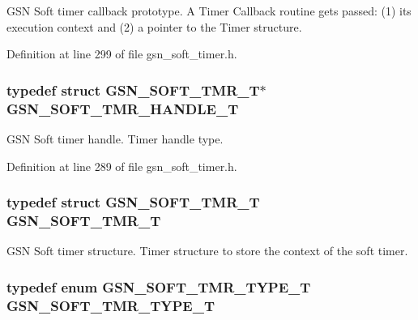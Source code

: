 GSN Soft timer callback prototype. A Timer Callback routine gets passed: (1) its execution context and (2) a pointer to the Timer structure. 



Definition at line 299 of file gsn\_\-soft\_\-timer.h.

\hypertarget{a00673_gaf35989ebc15417c38bca69fd5c17cceb}{
\subsubsection[{GSN\_\-SOFT\_\-TMR\_\-HANDLE\_\-T}]{\setlength{\rightskip}{0pt plus 5cm}typedef struct {\bf GSN\_\-SOFT\_\-TMR\_\-T}$\ast$ {\bf GSN\_\-SOFT\_\-TMR\_\-HANDLE\_\-T}}}
\label{a00673_gaf35989ebc15417c38bca69fd5c17cceb}


GSN Soft timer handle. Timer handle type. 



Definition at line 289 of file gsn\_\-soft\_\-timer.h.

\hypertarget{a00673_gac713d53bc7c13a7102bfce1b01b30c60}{
\subsubsection[{GSN\_\-SOFT\_\-TMR\_\-T}]{\setlength{\rightskip}{0pt plus 5cm}typedef struct {\bf GSN\_\-SOFT\_\-TMR\_\-T}  {\bf GSN\_\-SOFT\_\-TMR\_\-T}}}
\label{a00673_gac713d53bc7c13a7102bfce1b01b30c60}


GSN Soft timer structure. Timer structure to store the context of the soft timer. 

\hypertarget{a00673_ga9a084f729d0bbf7175b1b4f1b1ed9f2e}{
\subsubsection[{GSN\_\-SOFT\_\-TMR\_\-TYPE\_\-T}]{\setlength{\rightskip}{0pt plus 5cm}typedef enum {\bf GSN\_\-SOFT\_\-TMR\_\-TYPE\_\-T} {\bf GSN\_\-SOFT\_\-TMR\_\-TYPE\_\-T}}}
\label{a00673_ga9a084f729d0bbf7175b1b4f1b1ed9f2e}


